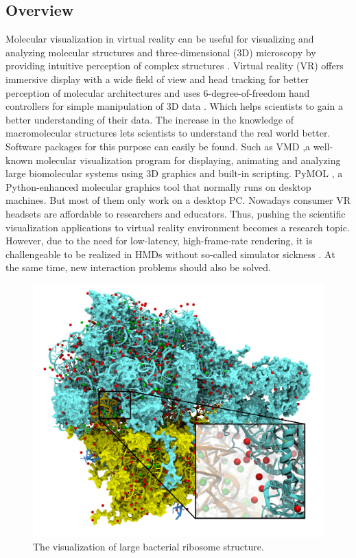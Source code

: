 \documentclass[10pt,twocolumn,letterpaper]{article}
\begin{document}
\subsection{Overview}
Molecular visualization in virtual reality can be useful for visualizing and analyzing molecular structures and three-dimensional (3D) microscopy by providing intuitive perception of complex structures \cite{Xu589366}. Virtual reality (VR) offers immersive display with a wide field of view and head tracking for better perception of molecular architectures and uses 6-degree-of-freedom hand controllers for simple manipulation of 3D data \cite{6DOF}. Which helps scientists to gain a better understanding of their data. The increase in the knowledge of macromolecular structures lets scientists to understand the real world better. Software packages for this purpose can easily be found. Such as VMD \cite{VMD},a well-known molecular visualization program for displaying, animating and analyzing large biomolecular systems using 3D graphics and built-in scripting. PyMOL \cite{pymol}, a Python-enhanced molecular graphics tool that normally runs on desktop machines. But most of them only work on a desktop PC. Nowadays consumer VR headsets are affordable to researchers and educators. Thus, pushing the scientific visualization applications to virtual reality environment becomes a research topic. However, due to the need for low-latency, high-frame-rate rendering, it is challengeable to be realized in HMDs without so-called simulator sickness \cite{LaViola:2000}. At the same time, new interaction problems should also be solved.

\begin{figure}[h]
\begin{center}
   \includegraphics[width=1.0\linewidth]{complex-structure.jpg}
\end{center}
   \caption{The visualization of large bacterial ribosome structure.}
\label{fig:complex-structure}
\end{figure}
\end{document}

